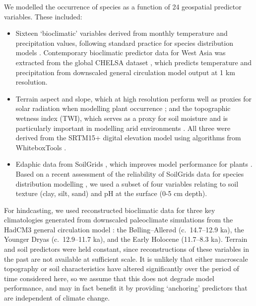 \documentclass[
  authoryear,
  preprint]{elsarticle}
\providecommand{\tightlist}{%
  \setlength{\itemsep}{0pt}\setlength{\parskip}{0pt}}\usepackage{longtable,booktabs,array}
\begin{document}
We modelled the occurrence of species as a function of 24 geospatial
predictor variables. These included:

\begin{itemize}
\tightlist
\item
  Sixteen `bioclimatic' variables derived from monthly temperature and
  precipitation values, following standard practice for species
  distribution models \citep{HijmansEtAl2005}. Contemporary bioclimatic
  predictor data for West Asia was extracted from the global CHELSA
  dataset \citep{KargerEtAl2017}, which predicts temperature and
  precipitation from downscaled general circulation model output at 1 km
  resolution.
\end{itemize}

\begin{itemize}
\tightlist
\item
  Terrain aspect and slope, which at high resolution perform well as
  proxies for solar radiation when modelling plant occurrence
  \citep{AustinVanNiel2011, LeempoelEtAl2015}; and the topographic
  wetness index (TWI), which serves as a proxy for soil moisture and is
  particularly important in modelling arid environments
  \citep{KopeckyCizkova2010, CamposEtAl2016, DiVirgilioEtAl2018}. All
  three were derived from the SRTM15+ digital elevation model using
  algorithms from WhiteboxTools \citep{Lindsay2016}.
\end{itemize}

\begin{itemize}
\tightlist
\item
  Edaphic data from SoilGrids \citep{HenglEtAl2014, HenglEtAl2017},
  which improves model performance for plants
  \citep{DubuisEtAl2013, ModEtAl2016, VelazcoEtAl2017}. Based on a
  recent assessment of the reliability of SoilGrids data for species
  distribution modelling \citep{MillerEtAl2024}, we used a subset of
  four variables relating to soil texture (clay, silt, sand) and pH at
  the surface (0-5 cm depth).
\end{itemize}

For hindcasting, we used reconstructed bioclimatic data for three key
climatologies generated from downscaled paleoclimate simulations from
the HadCM3 general circulation model
\citep{FordhamEtAl2017, BrownEtAl2018}: the Bølling--Allerød
(c.~14.7--12.9 ka), the Younger Dryas (c.~12.9--11.7 ka), and the Early
Holocene (11.7--8.3 ka). Terrain and soil predictors were held constant,
since reconstructions of these variables in the past are not available
at sufficient scale. It is unlikely that either macroscale topography or
soil characteristics have altered significantly over the period of time
considered here, so we assume that this does not degrade model
performance, and may in fact benefit it by providing `anchoring'
predictors that are independent of climate change.
\end{document}
